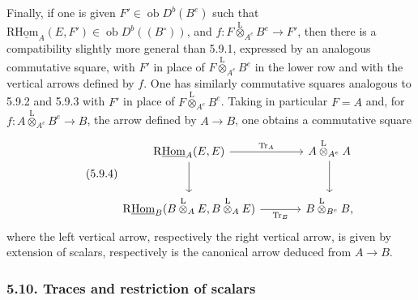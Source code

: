 \documentclass[11pt]{article}
\newcommand{\ob}{\operatorname{ob}}
\providecommand{\Tr}{\operatorname{Tr}}
\providecommand{\Tr}{\operatorname{Tr}}
\providecommand{\lten}{\overset{\mathrm L}{\otimes}}
\providecommand{\Tr}{\operatorname{Tr}}
\providecommand{\ob}{\operatorname{ob}}
\providecommand{\lten}{\overset{\mathrm L}{\otimes}}
\providecommand{\lten}{\overset{\mathrm L}{\otimes}}
\providecommand{\Tr}{\operatorname{Tr}}
\providecommand{\lten}{\overset{\mathrm L}{\otimes}}
\providecommand{\lten}{\overset{\mathrm L}{\otimes}}
\providecommand{\lten}{\overset{\mathrm L}{\otimes}}
\providecommand{\Tr}{\operatorname{Tr}}
\providecommand{\lten}{\overset{\mathrm L}{\otimes}}
\begin{document}
Finally, if one is given $F'\in\ob D^b(B^e)$ such that $\mathrm{R}\underline{\mathrm{Hom}}_A(E,F')\in\ob D^b((B^\circ))$, and $f:F\lten_{A^e}B^e\to F'$, then there is a compatibility slightly more general than 5.9.1, expressed by an analogous commutative square, with $F'$ in place of $F\lten_{A^e}B^e$ in the lower row and with the vertical arrows defined by $f$. One has similarly commutative squares analogous to 5.9.2 and 5.9.3 with $F'$ in place of $F\lten_{A^e}B^e$. Taking in particular $F=A$ and, for $f:A\lten_{A^e}B^e\to B$, the arrow defined by $A\to B$, one obtains a commutative square
\begin{equation}\tag{5.9.4}
\begin{tikzcd}[column sep=large,row sep=large]
\mathrm{R}\underline{\mathrm{Hom}}_A(E,E) \arrow[r,"\Tr_A"] \arrow[d] & A\lten_{A^e}A \arrow[d]\\
\mathrm{R}\underline{\mathrm{Hom}}_B(B\lten_AE,B\lten_AE) \arrow[r,"\Tr_B"'] & B\lten_{B^e}B,
\end{tikzcd}
\end{equation}
where the left vertical arrow, respectively the right vertical arrow, is given by extension of scalars, respectively is the canonical arrow deduced from $A\to B$.

\subsubsection*{5.10. Traces and restriction of scalars}
\end{document}
